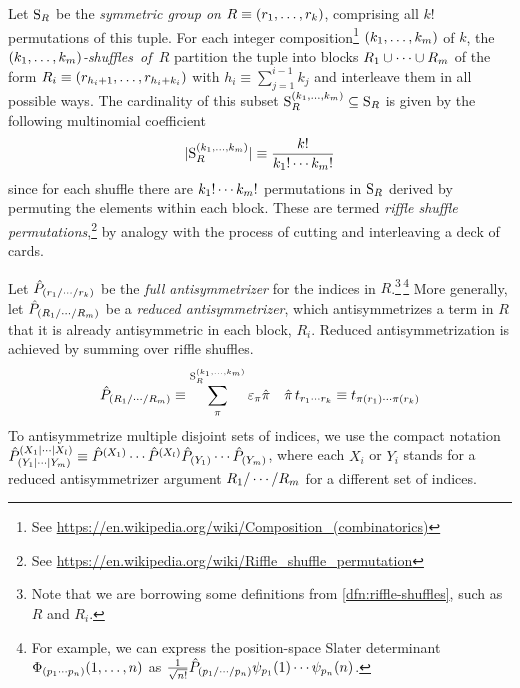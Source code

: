 \documentclass[11pt]{article}
\numberwithin{equation}{section}
\begin{document}
\newpage
\begin{dfn}\label{dfn:riffle-shuffles}
Let $\mathrm{S}_R$ be the \textit{symmetric group on $R\equiv(r_1,\ldots,r_k)$}, comprising all $k!$ permutations of this tuple.
For each integer composition\footnote{See \url{https://en.wikipedia.org/wiki/Composition_(combinatorics)}} $(k_1,\ldots,k_m)$ of $k$, the \textit{$(k_1,\ldots,k_m)$-shuffles~of~$R$} partition the tuple into blocks $R_1\cup\cdots\cup R_m$ of the form $R_i\equiv(r_{h_i+1},\ldots,r_{h_i+k_i})$ with $h_i\equiv\sum_{j=1}^{i-1}k_j$ and interleave them in all possible ways.
The cardinality of this subset $\mathrm{S}_R^{(k_1,\ldots,k_m)}\subseteq \mathrm{S}_R$ is given by the following multinomial coefficient
\begin{align}
  |\mathrm{S}_R^{(k_1,\ldots,k_m)}|
\equiv
  \frac {k!}{k_1!\cdots k_m!}
\end{align}
since for each shuffle there are $k_1!\cdots k_m!$ permutations in $\mathrm{S}_R$ derived by permuting the elements within each block.
These are termed \textit{riffle shuffle permutations},\footnote{See \url{https://en.wikipedia.org/wiki/Riffle_shuffle_permutation}} by analogy with the process of cutting and interleaving a deck of cards.
\end{dfn}

\begin{dfn}
Let $\hat{P}_{(r_1/\cdots/r_k)}$ be the \textit{full antisymmetrizer} for the indices in $R$.\footnote{Note that we are borrowing some definitions from \cref{dfn:riffle-shuffles}, such as $R$ and $R_i$.}\,\footnote{For example, we can express the position-space Slater determinant $\Phi _{(p_1\cdots p_n)}(1,\ldots,n)$ as $\frac {1}{\sqrt{n!}}\hat{P}_{(p_1/\cdots/p_n)}\psi _{p_1}(1)\cdots \psi _{p_n}(n)$.}
More generally, let $\hat{P}_{(R_1/\cdots/R_m)}$ be a \textit{reduced antisymmetrizer}, which antisymmetrizes a term in $R$ that it is already antisymmetric in each block, $R_i$.
Reduced antisymmetrization is achieved by summing over riffle shuffles.
\begin{align}
  \op{P}_{(R_1/\cd/R_m)}
\equiv
  \sum_\pi^{\mr{S}_R^{(k_1,\ld,k_m)}}
  \e_\pi
  \op{\pi}
&&
  \op{\pi}\,
  t_{r_1\cd r_k}
\equiv
  t_{\pi(r_1)\cd \pi(r_k)}
\end{align}
To antisymmetrize multiple disjoint sets of indices, we use the compact notation
$
  \hat{P}^{(X_1|\cdots|X_l)}_{(Y_1|\cdots|Y_m)}
\equiv
  \hat{P}^{(X_1)}\cdots \hat{P}^{(X_l)}
  \hat{P}_{(Y_1)}\cdots \hat{P}_{(Y_m)}
$,
where each $X_i$ or $Y_i$ stands for a reduced antisymmetrizer argument $R_1/\cdots/R_m$ for a different set of indices.
\end{dfn}
\end{document}
